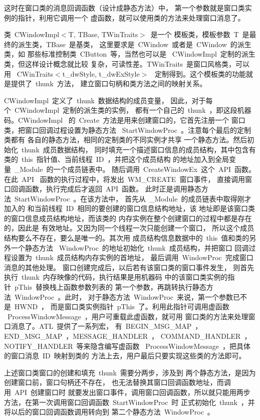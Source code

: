 这时在窗口类的消息回调函数（设计成静态方法）中，
第一个参数就是窗口类实例的指针，利用它调用一个
虚函数，就可以使用类的方法来处理窗口消息了。

类~CWindowImpl$<$T, TBase, TWinTraits$>$~是一个
模板类，模板参数~T~是最终的派生类，TBase~是基类，
这里要求是~CWindow~或者是~CWindow~的派生类，如
那些标准控制类~CButton~等，当然也可以是
~CWindowImpl~定制的派生类，但这样设计概念就比较
复杂，可读性差。TWinTraits~是窗口风格类，可以用
~CWinTraits$<$t\_dwStyle, t\_dwExStyle$>$~
定制得到。这个模板类的功能就是提供了~thunk~方法，
建立窗口句柄和类方法之间的映射关系。

CWindowImpl~定义了~thunk~数据结构的成员变量，
因此，对于每个~CWindowImpl~定制的派生类的实例，
都有一个自己的~thunk~，即这段机器码。CWindowImpl~
的~Create~方法是用来创建窗口的，它首先注册一个
窗口类，把窗口回调过程设置为静态方法
~StartWindowProc~。注意每个最后的定制类都有
各自的静态方法，相同的定制类的不同实例才共享
一个静态方法。然后初始化~thunk~成员数据结构，
同时填充一个描述窗口信息的成员结构，其中包含有
类的~this~指针值、当前线程~ID~，并把这个成员结构
的地址加入到全局变量~\_Module~的一个成员链表中。
随后调用~CreateWindowEx~这个~API~函数。在此~API~
函数的执行过程中，将发出~WM\_CREATE~窗口事件，
直接调用窗口回调函数，执行完成后才返回~API~函数。
此时正是调用静态方法~StartWindowProc~。在该方法中，
首先从~\_Module~的成员链表中取得刚才加入的
和当前线程~ID~相同的要创建的窗口信息结构地址，该
地址即是该窗口类的窗口信息成员结构地址，而该类的
内存实例在整个创建窗口的过程中都是存在的，因此是
有效地址。又因为同一个线程一次只能创建一个窗口，
所以这个成员结构要么不存在，要么是唯一的。其次用
成员结构信息数据中的~this~值和类的另外一个静态方法
~WindowProc~的地址初始化~thunk~成员结构，并把窗口
回调过程设置为~thunk~成员结构内存实例的首地址，
最后调用~WindowProc~完成窗口消息的其他处理。
窗口创建完成后，以后若有该窗口类的窗口事件发生，
则首先执行~thunk~内存映像的代码，执行结果是用机器码
中的该窗口类实例的指针~pThis~替换栈上函数参数列表的
第一个参数，再跳转执行静态方法~WindowProc~。此时，
对于静态方法~WindowProc~来说，第一个参数已不是~HWND~，
而是窗口类实例指针~pThis~了。利用此指针可调用虚函数
~ProcessWindowMessage~，用户可重载此虚函数，就可用
窗口类的方法来处理窗口消息了。ATL~提供了一系列宏，
有~BEGIN\_MSG\_MAP~，END\_MSG\_MAP~，MESSAGE\_HANDLER~，
COMMAND\_HANDLER~，NOTIFY\_HANDLER~等来隐含编写虚函数
~ProcessWindowMessage~，把具体的窗口消息~ID~映射到类的
方法上去，用户最后只要实现这些类的方法即可。

上述窗口类窗口的创建和填充~thunk~需要分两步，涉及到
两个静态方法，是因为创建窗口前，窗口句柄还不存在，
也无法替换其窗口回调函数地址，而调用~API~创建窗口时
就要发出窗口事件，调用窗口回调函数，所以就只能用两步
方法，在第一次调用窗口回调函数~StartWindowProc~时
正式初始化~thunk~，并将以后的窗口回调函数调用转向到
第二个静态方法~WindowProc~。

